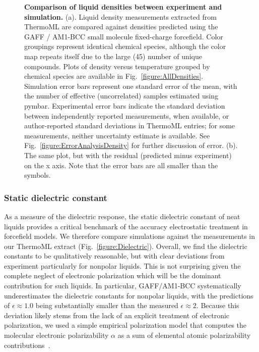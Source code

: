 \documentclass[aps,pre,twocolumn,nofootinbib,superscriptaddress,linenumbers]{revtex4-1}
\begin{document}
\begin{figure}
\caption{{\bf Comparison of liquid densities between experiment and simulation.}
(a).  Liquid density measurements extracted from ThermoML are compared against densities predicted using the GAFF / AM1-BCC small molecule fixed-charge forcefield.
Color groupings represent identical chemical species, although the color map repeats itself due to the large (45) number of unique compounds.
Plots of density versus temperature grouped by chemical species are available in Fig.~\ref{figure:AllDensities}.
Simulation error bars represent one standard error of the mean, with the number of effective (uncorrelated) samples estimated using pymbar.  
Experimental error bars indicate the standard deviation between independently reported measurements, when available, or author-reported standard deviations in ThermoML entries; for some measurements, neither uncertainty estimate is available.  
See Fig.~\ref{figure:ErrorAnalysisDensity} for further discussion of error.  (b).  The same plot, but with the residual (predicted minus experiment) on the x axis.  Note that the error bars are all smaller than the symbols.  
}
\label{figure:Density}
\end{figure}


\subsubsection{Static dielectric constant}

As a measure of the dielectric response, the static dielectric constant of neat liquids provides a critical benchmark of the accuracy electrostatic treatment in forcefield models.  
We therefore compare simulations against the measurements in our ThermoML extract (Fig.~\ref{figure:Dielectric}).  
Overall, we find the dielectric constants to be qualitatively reasonable, but with clear deviations from experiment particularly for nonpolar liquids. 
This is not surprising given the complete neglect of electronic polarization which will be the dominant contribution for such liquids.
In particular, GAFF/AM1-BCC systematically underestimates the dielectric constants for nonpolar liquids, with the predictions of $\epsilon \approx 1.0 $ being substantially smaller than the measured $\epsilon \approx 2$.  
Because this deviation likely stems from the lack of an explicit treatment of electronic polarization, we used a simple empirical polarization model that computes the molecular electronic polarizability $\alpha$ as a sum of elemental atomic polarizability contributions~\cite{bosque2002polarizabilities}.
\end{document}
